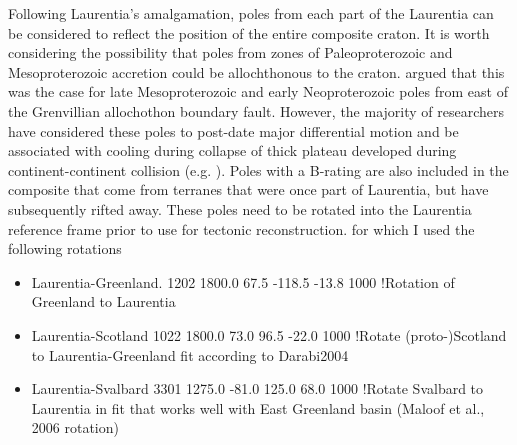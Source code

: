 \documentclass[11pt,letterpaper]{article}
\begin{document}
Following Laurentia's amalgamation, poles from each part of the Laurentia can be considered to reflect the position of the entire composite craton. It is worth considering the possibility that poles from zones of Paleoproterozoic and Mesoproterozoic accretion could be allochthonous to the craton. \cite{Hall201Xa} argued that this was the case for late Mesoproterozoic and early Neoproterozoic poles from east of the Grenvillian allochothon boundary fault. However, the majority of researchers have considered these poles to post-date major differential motion and be associated with cooling during collapse of thick plateau developed during continent-continent collision (e.g. \cite{}). Poles with a B-rating are also included in the composite that come from terranes that were once part of Laurentia, but have subsequently rifted away. These poles need to be rotated into the Laurentia reference frame prior to use for tectonic reconstruction. for which I used the following rotations

\begin{itemize}
\item Laurentia-Greenland.  1202 1800.0   67.5 -118.5  -13.8  1000 !Rotation of Greenland to Laurentia
\item Laurentia-Scotland 1022 1800.0   73.0   96.5  -22.0  1000 !Rotate (proto-)Scotland to Laurentia-Greenland fit according to Darabi2004
\item Laurentia-Svalbard 3301 1275.0  -81.0  125.0   68.0  1000 !Rotate Svalbard to Laurentia in fit that works well with East Greenland basin (Maloof et al., 2006 rotation)
\end{itemize}


\small
\end{document}
